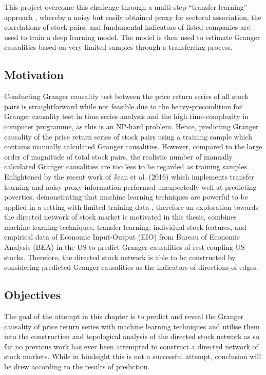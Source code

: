 This project overcome this challenge through a multi-step “transfer learning” approach \cite{pan2010survey}, whereby a noisy but easily obtained proxy for sectoral association, the correlations of stock pairs, and fundamental indicators of listed companies are used to train a deep learning model. The model is then used to estimate Granger causalities based on very limited samples through a transferring process.

\subsection{Motivation} %
Conducting Granger causality test between the price return series of all stock pairs is straightforward while not feasible due to the heavy-precondition for Granger causality test in time series analysis and the high time-complexity in computer programme, as this is an NP-hard problem. Hence, predicting Granger causality of the price return series of stock pairs using a training sample which contains manually calculated Granger causalities. However, compared to the large order of magnitude of total stock pairs, the realistic number of manually calculated Granger causalities are too less to be regarded as training samples. Enlightened by the recent work of Jean et al. (2016) which implements transfer learning and noisy proxy information performed unexpectedly well at predicting poverties, demonstrating that machine learning techniques are powerful to be applied in a setting with limited training data \cite{jean2016combining}, therefore an exploration towards the directed network of stock market is motivated in this thesis, combines machine learning techniques, transfer learning, individual stock features, and empirical data of Economic Input-Output (EIO) from Bureau of Economic Analysis (BEA) in the US to predict Granger causalities of rest coupling US stocks. Therefore, the directed stock network is able to be constructed by considering predicted Granger causalities as the indicators of directions of edges.

\subsection{Objectives} %
The goal of the attempt in this chapter is to predict and reveal the Granger causality of price return series with machine learning techniques and utilise them into the construction and topological analysis of the directed stock network as so far no previous work has ever been attempted to construct a directed network of stock markets. While in hindsight this is not a successful attempt, conclusion will be drew according to the results of prediction.

